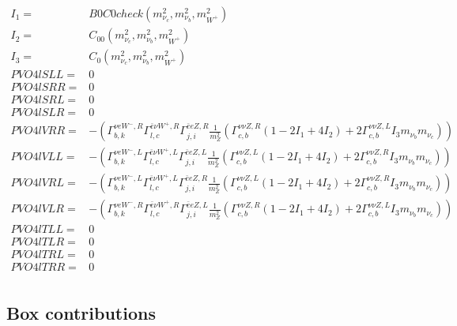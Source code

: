\documentclass[A4,landscape]{article}
\begin{document}
\begin{align} 
I_1= & B0C0check(m^2_{\nu_{{c}}}, m^2_{\nu_{{b}}}, m^2_{W^+}) \\ 
I_2= & C_{00}(m^2_{\nu_{{c}}}, m^2_{\nu_{{b}}}, m^2_{W^+}) \\ 
I_3= & C_0(m^2_{\nu_{{c}}}, m^2_{\nu_{{b}}}, m^2_{W^+}) \\ 
  PVO4lSLL= & 0 \\ 
  PVO4lSRR= & 0 \\ 
  PVO4lSRL= & 0 \\ 
  PVO4lSLR= & 0 \\ 
  PVO4lVRR= & -( \Gamma^{\nu e W^-,R}_{b, k} \Gamma^{\bar{e}\nu W^+ ,R}_{l, c} \Gamma^{\bar{e}e Z ,R}_{j, i} \frac{1}{m^2_{Z}} (\Gamma^{\nu \nu Z ,R}_{c, b} (1 - 2 I_1 + 4 I_2) + 2 \Gamma^{\nu \nu Z ,L}_{c, b} I_3 m_{\nu_{{b}}} m_{\nu_{{c}}})) \\ 
  PVO4lVLL= & -( \Gamma^{\nu e W^-,L}_{b, k} \Gamma^{\bar{e}\nu W^+ ,L}_{l, c} \Gamma^{\bar{e}e Z ,L}_{j, i} \frac{1}{m^2_{Z}} (\Gamma^{\nu \nu Z ,L}_{c, b} (1 - 2 I_1 + 4 I_2) + 2 \Gamma^{\nu \nu Z ,R}_{c, b} I_3 m_{\nu_{{b}}} m_{\nu_{{c}}})) \\ 
  PVO4lVRL= & -( \Gamma^{\nu e W^-,L}_{b, k} \Gamma^{\bar{e}\nu W^+ ,L}_{l, c} \Gamma^{\bar{e}e Z ,R}_{j, i} \frac{1}{m^2_{Z}} (\Gamma^{\nu \nu Z ,L}_{c, b} (1 - 2 I_1 + 4 I_2) + 2 \Gamma^{\nu \nu Z ,R}_{c, b} I_3 m_{\nu_{{b}}} m_{\nu_{{c}}})) \\ 
  PVO4lVLR= & -( \Gamma^{\nu e W^-,R}_{b, k} \Gamma^{\bar{e}\nu W^+ ,R}_{l, c} \Gamma^{\bar{e}e Z ,L}_{j, i} \frac{1}{m^2_{Z}} (\Gamma^{\nu \nu Z ,R}_{c, b} (1 - 2 I_1 + 4 I_2) + 2 \Gamma^{\nu \nu Z ,L}_{c, b} I_3 m_{\nu_{{b}}} m_{\nu_{{c}}})) \\ 
  PVO4lTLL= & 0 \\ 
  PVO4lTLR= & 0 \\ 
  PVO4lTRL= & 0 \\ 
  PVO4lTRR= & 0 \\ 
\end{align} 
\subsection{Box contributions} 
\end{document}

